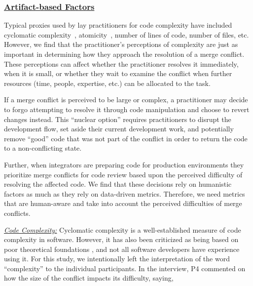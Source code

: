 \subsubsection{\underline{Artifact-based Factors}}
Typical proxies used by lay practitioners for code complexity have included cyclomatic complexity~\cite{fenton2000quantitative}, atomicity~\cite{khelladi2016ad}, number of lines of code, number of files, etc.
However, we find that the practitioner's perceptions of complexity are just as important in determining how they approach the resolution of a merge conflict.
These perceptions can affect whether the practitioner resolves it immediately, when it is small, or whether they wait to examine the conflict when further resources (time, people, expertise, etc.) can be allocated to the task.

If a merge conflict is perceived to be large or complex, a practitioner may decide to forgo attempting to resolve it through code manipulation and choose to revert changes instead.
This ``nuclear option'' requires practitioners to disrupt the development flow, set aside their current development work, and potentially remove ``good'' code that was not part of the conflict in order to return the code to a non-conflicting state.

Further, when integrators are preparing code for production environments they prioritize merge conflicts for code review based upon the perceived difficulty of resolving the affected code.
We find that these decisions rely on humanistic factors as much as they rely on data-driven metrics.
Therefore, we need metrics that are human-aware and take into account the perceived difficulties of merge conflicts.


\underline{\textit{Code Complexity:}} Cyclomatic complexity \cite{mccabe1976complexity} is a well-established measure of code complexity in software. However, it has also been criticized as being based on poor theoretical foundations \cite{Shepperd1988}, and not all software developers have experience using it. For this study, we intentionally left the interpretation of the word ``complexity'' to the individual participants.
In the interview, P4 commented on how the size of the conflict impacts its difficulty, saying,

